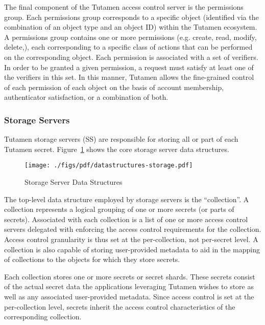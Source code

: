 The final component of the Tutamen access control server is the
permissions group. Each permissions group corresponds to a specific
object (identified via the combination of an object type and an object
ID) within the Tutamen ecosystem. A permissions group contains one or
more permissions (e.g. create, read, modify, delete,), each
corresponding to a specific class of actions that can be performed on
the corresponding object. Each permission is associated with a set of
verifiers. In order to be granted a given permission, a request must
satisfy at least one of the verifiers in this set. In this manner,
Tutamen allows the fine-grained control of each permission of each
object on the basis of account membership, authenticator satisfaction,
or a combination of both.

\subsubsection{Storage Servers}
\label{sec:tutamen:arch:ss}

Tutamen storage servers (SS) are responsible for storing all or part
of each Tutamen secret. Figure~\ref{fig:tutamen:storagestructs} shows
the core storage server data structures.

\begin{figure}[th]
  \centering
  \texttt{[image: ./figs/pdf/datastructures-storage.pdf]}
  \caption{Storage Server Data Structures}
  \label{fig:tutamen:storagestructs}
\end{figure}

The top-level data structure employed by storage servers is the
``collection''. A collection represents a logical grouping of one or
more secrets (or parts of secrets). Associated with each collection is
a list of one or more access control servers delegated with enforcing
the access control requirements for the collection. Access control
granularity is thus set at the per-collection, not per-secret level. A
collection is also capable of storing user-provided metadata to aid in
the mapping of collections to the objects for which they store
secrets.

Each collection stores one or more secrets or secret shards. These
secrets consist of the actual secret data the applications leveraging
Tutamen wishes to store as well as any associated user-provided
metadata. Since access control is set at the per-collection level,
secrets inherit the access control characteristics of the
corresponding collection.

